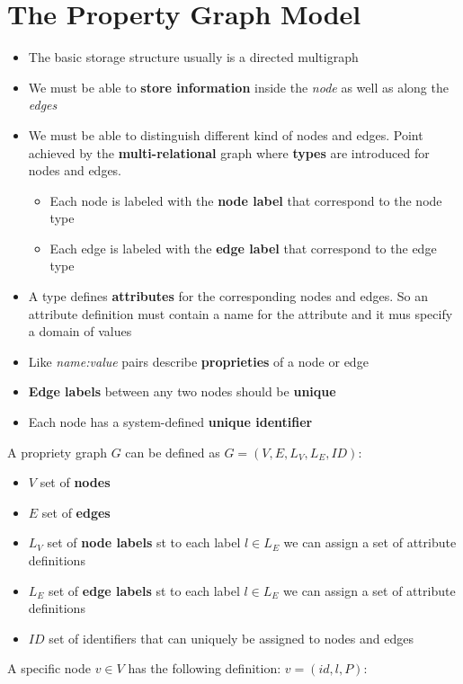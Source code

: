 \section{The Property Graph Model}
\begin{itemize}
    \item The basic storage structure usually is a directed multigraph
    \item We must be able to \textbf{store information} inside the \textit{node} as well as along the \textit{edges}
    \item We must be able to distinguish different kind of nodes and edges. Point achieved by the \textbf{multi-relational} graph where \textbf{types} are introduced for nodes and edges.
    \begin{itemize}
        \item Each node is labeled with the \textbf{node label} that correspond to the node type
        \item Each edge is labeled with the \textbf{edge label} that correspond to the edge type
    \end{itemize}
    \item A type defines \textbf{attributes} for the corresponding nodes and edges. So an attribute definition must contain a name for the attribute and it mus specify a domain of values
    \item Like \textit{name:value} pairs describe \textbf{proprieties} of a node or edge
    \item \textbf{Edge labels} between any two nodes should be \textbf{unique}
    \item Each node has a system-defined \textbf{unique identifier}
\end{itemize}
A propriety graph \(G\) can be defined as \(G = (V, E, L_V, L_E, ID)\):
\begin{itemize}
    \item \(V\) set of \textbf{nodes}
    \item \(E\) set of \textbf{edges}
    \item \(L_V\) set of \textbf{node labels} st to each label \(l \in L_E\) we can assign a set of attribute definitions
    \item \(L_E\) set of \textbf{edge labels} st to each label \(l \in L_E\) we can assign a set of attribute definitions
    \item \(ID\) set of identifiers that can uniquely be assigned to nodes and edges
\end{itemize}
A specific node \(v \in V\) has the following definition: \(v = (id, l, P)\):
